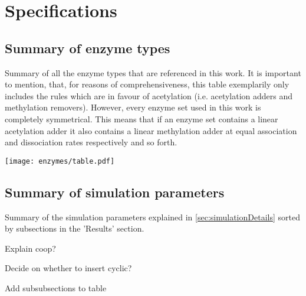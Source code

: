 \chapter{Specifications}
\label{app:RunSpec}

\section{Summary of enzyme types}

\begin{table}[htbp!]
    \caption{Summary of all the enzyme types that are referenced in this work. It is important to mention, that, for reasons of comprehensiveness, this table exemplarily only includes the rules which are in favour of acetylation (i.e. acetylation adders and methylation removers). However, every enzyme set used in this work is completely symmetrical. This means that if an enzyme set contains a linear acetylation adder it also contains a linear methylation adder at equal association and dissociation rates respectively and so forth.}
    \texttt{[image: enzymes/table.pdf]}
    \label{img:enzymeTypeSummary}
\end{table}

\section{Summary of simulation parameters}

\begin{table}[htbp!]
    \caption{Summary of the simulation parameters explained in \ref{sec:simulationDetails} sorted by subsections in the 'Results' section.}
    \label{tab:simulationParametersSummary}
\end{table}
\begin{itemize}
    {
        \color{red}
        \item Explain coop?
        \item Decide on whether to insert cyclic?
        \item Add subsubsections to table
    }
\end{itemize}



